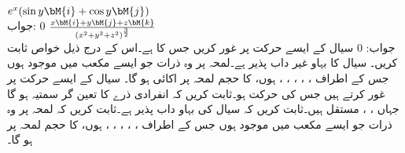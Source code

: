 \quad
$e^x(\sin y\bM{i}+\cos y\bM{j})$\\
جواب:\quad 
$0$
\quad
$\frac{x\bM{i}+y\bM{j}+z\bM{k}}{(x^2+y^2+z^2)^{\frac{3}{2}}}$\\
جواب:\quad 
$0$
سیال کے ایسے حرکت پر غور کریں جس کا  ہے۔اس کے درج ذیل خواص ثابت کریں۔ سیال کا بہاو غیر داب پذیر ہے۔لمحہ  پر وہ ذرات جو  ایسے مکعب میں موجود ہوں جس کے اطراف ، ، ، ، ،  ہوں، کا حجم لمحہ  پر اکائی ہو گا۔  
سیال کے ایسے حرکت پر غور کرتے ہیں جس کی حرکت  ہو۔ثابت کریں کہ انفرادی ذرے کا تعین گر سمتیہ  ہو گا جہاں ، ،  مستقل ہیں۔ثابت کریں  کہ سیال کی بہاو داب پذیر ہے۔ثابت کریں کہ لمحہ  پر وہ ذرات جو  ایسے مکعب میں موجود ہوں جس کے اطراف ، ، ، ، ،  ہوں، کا حجم لمحہ  پر  ہو گا۔  
